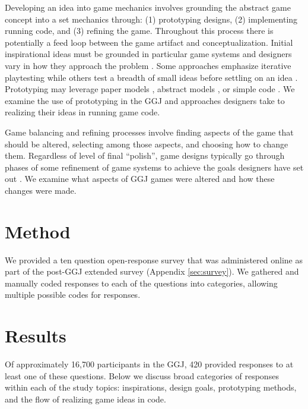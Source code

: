 \documentclass{sig-alternate}
\begin{document}
Developing an idea into game mechanics involves grounding the abstract game concept into a set mechanics through: (1) prototyping designs, (2) implementing running code, and (3) refining the game. Throughout this process there is potentially a feed loop between the game artifact and conceptualization. Initial inspirational ideas must be grounded in particular game systems and designers vary in how they approach the problem \cite{gabler2005:7day-prototype} \cite{manker2011:prototyping} \cite{nelson2009:reqanal}. Some approaches emphasize iterative playtesting \cite{fullerton2008:playcentric} \cite{schell2008:gamedesign} while others test a breadth of small ideas before settling on an idea \cite{gabler2005:7day-prototype}. Prototyping may leverage paper models \cite{manker2011:prototyping}, abstract models \cite{nelson2009:reqanal} \cite{dormans2011:machinations2}, or simple code \cite{gabler2005:7day-prototype}. We examine the use of prototyping in the GGJ and approaches designers take to realizing their ideas in running game code.

Game balancing and refining processes involve finding aspects of the game that should be altered, selecting among those aspects, and choosing how to change them. Regardless of level of final ``polish'', game designs typically go through phases of some refinement of game systems to achieve the goals designers have set out \cite{schell2008:gamedesign} \cite{fullerton2008:playcentric}. We examine what aspects of GGJ games were altered and how these changes were made.

\section{Method}
We provided a ten question open-response survey that was administered online as part of the post-GGJ extended survey (Appendix \ref{sec:survey}). We gathered and manually coded responses to each of the questions into categories, allowing multiple possible codes for responses.


\section{Results}
Of approximately 16,700 participants in the GGJ, 420 provided responses to at least one of these questions.
Below we discuss broad categories of responses within each of the study topics: inspirations, design goals, prototyping methods, and the flow of realizing game ideas in code.

\end{document}
